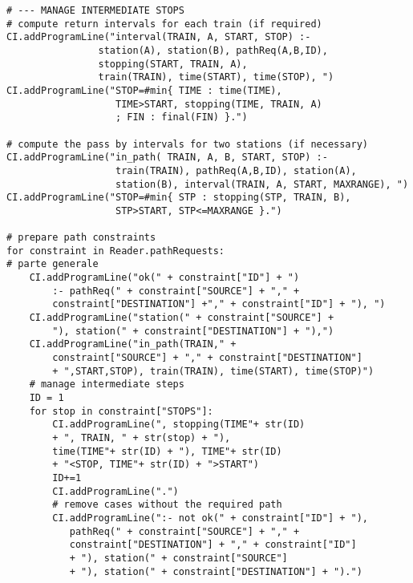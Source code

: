 \documentclass[11pt]{article}
\begin{document}
\begin{verbatim}
# --- MANAGE INTERMEDIATE STOPS
# compute return intervals for each train (if required)
CI.addProgramLine("interval(TRAIN, A, START, STOP) :-
                station(A), station(B), pathReq(A,B,ID), 
                stopping(START, TRAIN, A),
                train(TRAIN), time(START), time(STOP), ")
CI.addProgramLine("STOP=#min{ TIME : time(TIME), 
                   TIME>START, stopping(TIME, TRAIN, A)
                   ; FIN : final(FIN) }.")
    
# compute the pass by intervals for two stations (if necessary)
CI.addProgramLine("in_path( TRAIN, A, B, START, STOP) :- 
                   train(TRAIN), pathReq(A,B,ID), station(A),
                   station(B), interval(TRAIN, A, START, MAXRANGE), ")
CI.addProgramLine("STOP=#min{ STP : stopping(STP, TRAIN, B), 
                   STP>START, STP<=MAXRANGE }.")
    
# prepare path constraints
for constraint in Reader.pathRequests:
# parte generale
    CI.addProgramLine("ok(" + constraint["ID"] + ") 
        :- pathReq(" + constraint["SOURCE"] + "," +
        constraint["DESTINATION"] +"," + constraint["ID"] + "), ")
    CI.addProgramLine("station(" + constraint["SOURCE"] + 
        "), station(" + constraint["DESTINATION"] + "),")
    CI.addProgramLine("in_path(TRAIN," + 
        constraint["SOURCE"] + "," + constraint["DESTINATION"] 
        + ",START,STOP), train(TRAIN), time(START), time(STOP)")
    # manage intermediate steps
    ID = 1
    for stop in constraint["STOPS"]:
        CI.addProgramLine(", stopping(TIME"+ str(ID)
        + ", TRAIN, " + str(stop) + "),
        time(TIME"+ str(ID) + "), TIME"+ str(ID) 
        + "<STOP, TIME"+ str(ID) + ">START")
        ID+=1
        CI.addProgramLine(".")   
        # remove cases without the required path
        CI.addProgramLine(":- not ok(" + constraint["ID"] + "),
           pathReq(" + constraint["SOURCE"] + "," + 
           constraint["DESTINATION"] + "," + constraint["ID"] 
           + "), station(" + constraint["SOURCE"]
           + "), station(" + constraint["DESTINATION"] + ").")
\end{verbatim}
\end{document}
